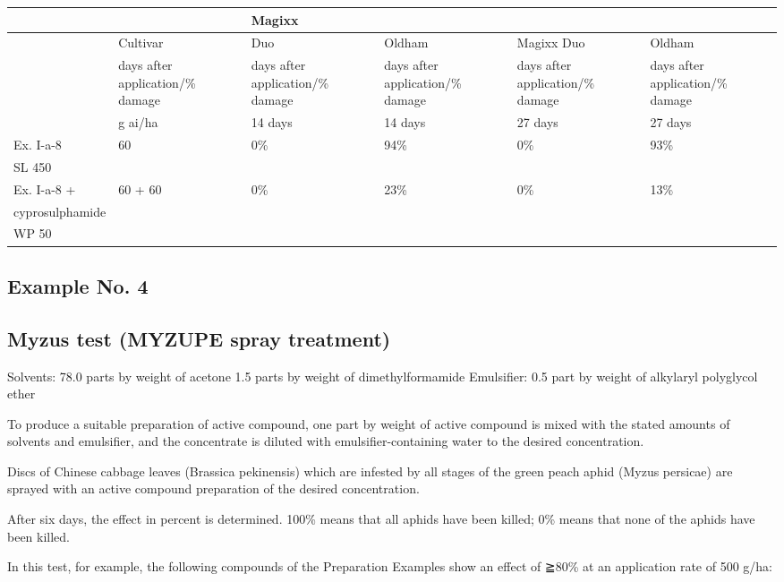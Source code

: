 \documentclass[11pt,a4paper]{article}
\begin{document}
\begin{table}[h]
\begin{tabular}{|l|l|l|l|l|l|}
\hline
 &  & Magixx &  &  &  \\ \hline
 & Cultivar & Duo & Oldham & Magixx Duo & Oldham \\ \hline
 & days after application/\% damage & days after application/\% damage & days after application/\% damage & days after application/\% damage & days after application/\% damage \\ \hline
 & g ai/ha & 14 days & 14 days & 27 days & 27 days \\ \hline
Ex. I-a-8 & 60 & 0\% & 94\% & 0\% & 93\% \\ \hline
SL 450 &  &  &  &  &  \\ \hline
Ex. I-a-8 + & 60 + 60 & 0\% & 23\% & 0\% & 13\% \\ \hline
cyprosulphamide &  &  &  &  &  \\ \hline
WP 50 &  &  &  &  &  \\ \hline
\end{tabular}
\end{table}

\subsection{Example No. 4}

\subsection{Myzus test (MYZUPE spray treatment)}

Solvents: 78.0 parts by weight of acetone 1.5 parts by weight of dimethylformamide Emulsifier: 0.5 part by weight of alkylaryl polyglycol ether

To produce a suitable preparation of active compound, one part by weight of active compound is mixed with the stated amounts of solvents and emulsifier, and the concentrate is diluted with emulsifier-containing water to the desired concentration.

Discs of Chinese cabbage leaves (Brassica pekinensis) which are infested by all stages of the green peach aphid (Myzus persicae) are sprayed with an active compound preparation of the desired concentration.

After six days, the effect in percent is determined. 100\% means that all aphids have been killed; 0\% means that none of the aphids have been killed.

In this test, for example, the following compounds of the Preparation Examples show an effect of ≧80\% at an application rate of 500 g/ha:
\end{document}
